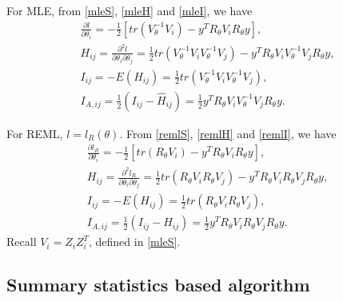 \documentclass[
]{article}
\begin{document}
For MLE, from \eqref{mleS}, \eqref{mleH} and \eqref{mleI}, we have
\begin{equation}\label{gMLE}
\begin{array}{l}
\frac{\partial l}{\partial\theta_i}  = 
-\frac{1}{2}[tr(V_{\theta}^{-1}V_i) - y^TR_{\theta}V_iR_{\theta}y],\\
H_{ij} =
\frac{\partial^2l}{\partial\theta_i\partial\theta_j} = \frac{1}{2}tr(V_{\theta}^{-1}V_iV_{\theta}^{-1}V_j) - y^TR_{\theta}V_iV_{\theta} ^{-1}V_jR_{\theta}y,\\
I_{ij} = -E(H_{ij}) = \frac{1}{2}tr(V_{\theta}^{-1}V_iV_{\theta}^{-1}V_j),\\
I_{A,ij} =\frac{1}{2}(I_{ij} - \hat H_{ij}) = \frac{1}{2}y^TR_{\theta}V_iV_{\theta} ^{-1}V_jR_{\theta}y.
\end{array}
\end{equation}

For REML, \(l = l_R(\theta)\). From \eqref{remlS}, \eqref{remlH} and
\eqref{remlI}, we have \begin{equation}\label{gREML}
\begin{array}{l}
\frac{\partial l_R}{\partial\theta_i}
= -\frac{1}{2}[tr(R_{\theta}V_i) - y^TR_{\theta}V_iR_{\theta}y],\\
H_{ij} = \frac{\partial^2l_R}{\partial\theta_i\partial\theta_j}
= \frac{1}{2}tr(R_{\theta}V_iR_{\theta}V_j) - y^TR_{\theta}V_iR_{\theta}V_jR_{\theta}y,\\
I_{ij} = -E(H_{ij})
= \frac{1}{2}tr(R_{\theta}V_iR_{\theta}V_j),\\
I_{A,ij} =
\frac{1}{2}(I_{ij} - H_{ij}) = \frac{1}{2}y^TR_{\theta}V_iR_{\theta}V_jR_{\theta}y.
\end{array}
\end{equation} Recall \(V_i = Z_iZ_i^T\), defined in \eqref{mleS}.

\hypertarget{summary-statistics-based-algorithm}{%
\subsection{Summary statistics based
algorithm}\label{summary-statistics-based-algorithm}}
\end{document}
